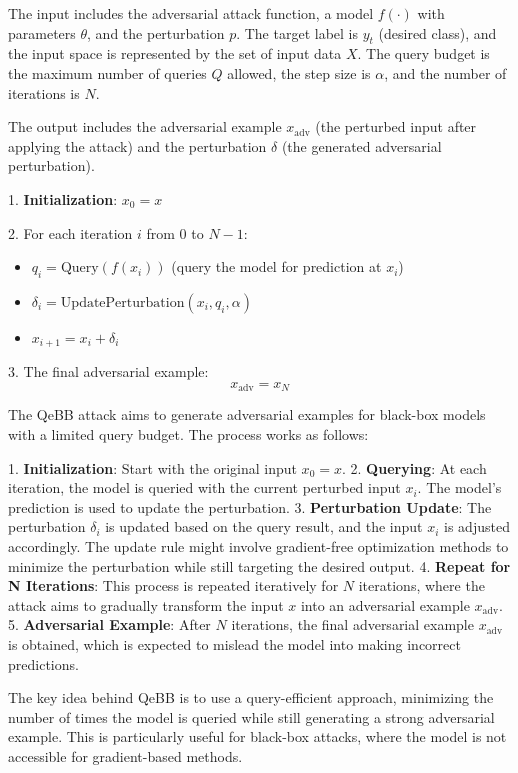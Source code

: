 The input includes the adversarial attack function, a model $f(\cdot)$ with parameters $\theta$, and the perturbation $p$. 
The target label is $y_t$ (desired class), and the input space is represented by the set of input data $X$. 
The query budget is the maximum number of queries $Q$ allowed, the step size is $\alpha$, and the number of iterations is $N$.

The output includes the adversarial example $x_{\text{adv}}$ (the perturbed input after applying the attack) and the perturbation $\delta$ (the generated adversarial perturbation).

1. \textbf{Initialization}: 
   $x_0 = x$
   
2. For each iteration $i$ from $0$ to $N-1$:
   \begin{itemize}
   \item $q_i = \text{Query}(f(x_i))$ (query the model for prediction at $x_i$)
   \item $\delta_i = \text{UpdatePerturbation}(x_i, q_i, \alpha)$
   \item $x_{i+1} = x_i + \delta_i$
   \end{itemize}

3. The final adversarial example:
   \[
   x_{\text{adv}} = x_N
   \]

The QeBB attack aims to generate adversarial examples for black-box models with a limited query budget. The process works as follows:

1. \textbf{Initialization}: Start with the original input $x_0 = x$.
2. \textbf{Querying}: At each iteration, the model is queried with the current perturbed input $x_i$. The model's prediction is used to update the perturbation.
3. \textbf{Perturbation Update}: The perturbation $\delta_i$ is updated based on the query result, and the input $x_i$ is adjusted accordingly. The update rule might involve gradient-free optimization methods to minimize the perturbation while still targeting the desired output.
4. \textbf{Repeat for N Iterations}: This process is repeated iteratively for $N$ iterations, where the attack aims to gradually transform the input $x$ into an adversarial example $x_{\text{adv}}$.
5. \textbf{Adversarial Example}: After $N$ iterations, the final adversarial example $x_{\text{adv}}$ is obtained, which is expected to mislead the model into making incorrect predictions.

The key idea behind QeBB is to use a query-efficient approach, minimizing the number of times the model is queried while still generating a strong adversarial example. This is particularly useful for black-box attacks, where the model is not accessible for gradient-based methods.
